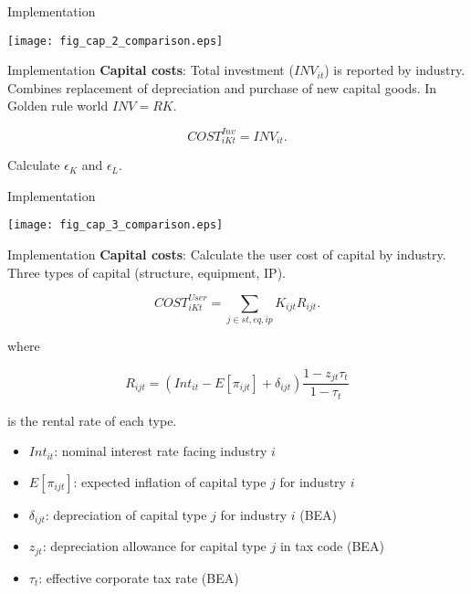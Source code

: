 \documentclass[10pt, xcolor=dvipsnames]{beamer}
\begin{document}
\begin{frame}{Implementation}
\begin{center}
\texttt{[image: fig\_cap\_2\_comparison.eps]}
\end{center}
\end{frame}

\begin{frame}{Implementation}
\textbf{Capital costs}: Total investment ($INV_{it}$) is reported by industry. Combines replacement of depreciation and purchase of new capital goods. In Golden rule world $INV = RK$. 

\begin{equation}
  COST_{iKt}^{Inv} = INV_{it}.
\end{equation}

Calculate $\epsilon_K$ and $\epsilon_L$. 

\end{frame}

\begin{frame}{Implementation}
\begin{center}
\texttt{[image: fig\_cap\_3\_comparison.eps]}
\end{center}
\end{frame}

\begin{frame}{Implementation}
\textbf{Capital costs}: Calculate the user cost of capital by industry. Three types of capital (structure, equipment, IP).

\begin{equation}
  COST^{User}_{iKt} = \sum_{j \in st,eq,ip} K_{ijt} R_{ijt}.
\end{equation}

where 

\begin{equation}
  R_{ijt} = (Int_{it} - E[\pi_{ijt}] + \delta_{ijt})\frac{1-z_{jt} \tau_t}{1-\tau_t}
\end{equation}

is the rental rate of each type. 

\begin{itemize}
  \item $Int_{it}$: nominal interest rate facing industry $i$
  \item $E[\pi_{ijt}]$: expected inflation of capital type $j$ for industry $i$
  \item $\delta_{ijt}$: depreciation of capital type $j$ for industry $i$ (BEA)
  \item $z_{jt}$: depreciation allowance for capital type $j$ in tax code (BEA)
  \item $\tau_t$: effective corporate tax rate (BEA)
\end{itemize}

\end{frame}
\end{document}
